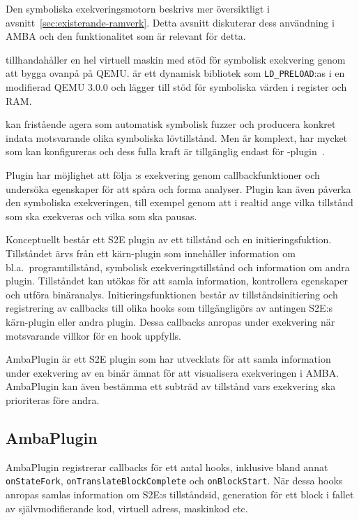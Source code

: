 Den symboliska exekveringsmotorn \stoe{} beskrivs mer översiktligt i
avsnitt~\ref{sec:existerande-ramverk}. Detta avsnitt diskuterar dess användning
i AMBA och den funktionalitet som är relevant för detta.\@

\stoe{} tillhandahåller en hel virtuell maskin med stöd för symbolisk exekvering
genom att bygga ovanpå på QEMU.\@ \stoe{} är ett dynamisk bibliotek som
\verb|LD_PRELOAD|:as i en modifierad QEMU 3.0.0 och lägger till stöd för
symboliska värden i register och RAM.\@

\stoe{} kan fristående agera som automatisk symbolisk fuzzer och producera
konkret indata motsvarande olika symboliska lövtillstånd. Men \stoe{} är
komplext, har mycket som kan konfigureras och dess fulla kraft är tillgänglig
endast för \stoe{}-plugin~\cite{Chipounov12}.

Plugin har möjlighet att följa \stoe{}:s exekvering genom callbackfunktioner och
undersöka egenskaper för att spåra och forma analyser. Plugin kan även påverka
den symboliska exekveringen, till exempel genom att i realtid ange vilka
tillstånd som ska exekveras och vilka som ska pausas.

Konceptuellt består ett S2E plugin av ett tillstånd och en initieringsfuktion.
Tillståndet ärvs från ett kärn-plugin som innehåller information om bl.a.\
programtillstånd, symbolisk exekveringstillstånd och information om andra
plugin. Tillståndet kan utökas för att samla information, kontrollera egenskaper
och utföra binäranalys. Initieringsfunktionen består av tillståndsinitiering och
registrering av callbacks till olika hooks som tillgängligörs av antingen S2E:s
kärn-plugin eller andra plugin. Dessa callbacks anropas under exekvering när
motsvarande villkor för en hook uppfylls.

AmbaPlugin är ett S2E plugin som har utvecklats för att samla information under
exekvering av en binär ämnat för att visualisera exekveringen i AMBA.\@
AmbaPlugin kan även bestämma ett subträd av tillstånd vars exekvering ska
prioriteras före andra.

\subsection{AmbaPlugin}

AmbaPlugin registrerar callbacks för ett antal hooks, inklusive bland annat
\texttt{onStateFork}, \texttt{onTranslateBlockComplete} och
\texttt{onBlockStart}. När dessa hooks anropas samlas information om S2E:s
tillståndsid, generation för ett block i fallet av självmodifierande kod,
virtuell adress, maskinkod etc.

